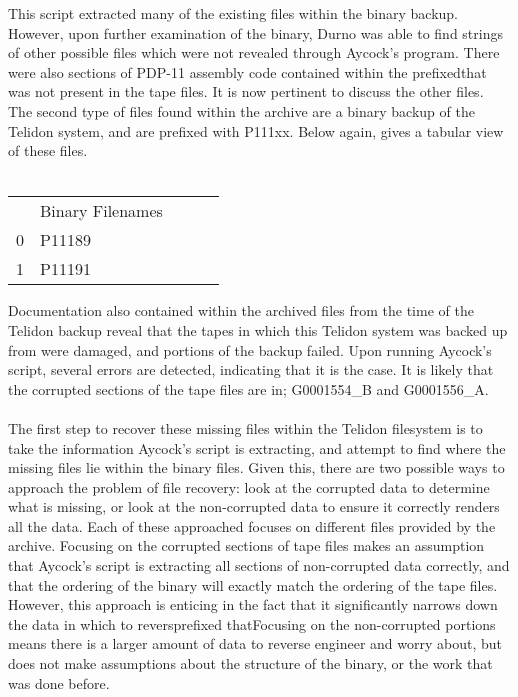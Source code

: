 \documentclass[sigconf]{acmart}
\begin{document}
This script extracted many of the existing files within the binary backup. However, upon further examination of the binary, Durno was able to find strings of other possible files which were not revealed through Aycock’s program. There were also sections of PDP-11 assembly code contained within the prefixedthat was not present in the tape files. It is now pertinent to discuss the other files. The second type of files found within the archive are a binary backup of the Telidon system, and are prefixed with P111xx. Below again, gives a tabular view of these files. \\ \\

\begin{table}[h]
\begin{tabular}{lllll}
\cline{1-2}
\multicolumn{1}{|l|}{}  & \multicolumn{1}{l|}{Binary Filenames} &  &  &  \\ \cline{1-2}
\multicolumn{1}{|l|}{0} & \multicolumn{1}{l|}{P11189}           &  &  &  \\ \cline{1-2}
\multicolumn{1}{|l|}{1} & \multicolumn{1}{l|}{P11191}           &  &  &  \\ \cline{1-2}
\end{tabular}
\end{table}


Documentation also contained within the archived files from the time of the Telidon backup reveal that the tapes in which this Telidon system was backed up from were damaged, and portions of the backup failed. Upon running Aycock's script, several errors are detected, indicating that it is the case. It is likely that the corrupted sections of the tape files are in; G0001554\_B and G0001556\_A.  \\ \\

The first step to recover these missing files within the Telidon filesystem is to take the information Aycock's script is extracting, and attempt to find where the missing files lie within the binary files. Given this, there are two possible ways to approach the problem of file recovery: look at the corrupted data to determine what is missing, or look at the non-corrupted data to ensure it correctly renders all the data. Each of these approached focuses on different files provided by the archive. Focusing on the corrupted sections of tape files makes an assumption that Aycock's script is extracting all sections of non-corrupted data correctly, and that the ordering of the binary will exactly match the ordering of the tape files. However, this approach is enticing in the fact that it significantly narrows down the data in which to reversprefixed thatFocusing on the non-corrupted portions means there is a larger amount of data to reverse engineer and worry about, but does not make assumptions about the structure of the binary, or the work that was done before. \\ \\ 
\end{document}
